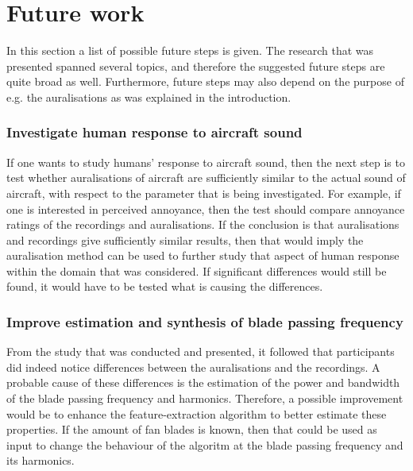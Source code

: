 \newpage
\section{Future work}
In this section a list of possible future steps is given. The research that was
presented spanned several topics, and therefore the suggested future steps are
quite broad as well. Furthermore, future steps may also depend on the purpose of
e.g. the auralisations as was explained in the introduction.

\subsubsection*{Investigate human response to aircraft sound}
If one wants to study humans' response to aircraft sound, then the next step is
to test whether auralisations of aircraft are sufficiently similar to the actual
sound of aircraft, with respect to the parameter that is being investigated. For
example, if one is interested in perceived annoyance, then the test should
compare annoyance ratings of the recordings and auralisations. If the conclusion
is that auralisations and recordings give sufficiently similar results, then
that would imply the auralisation method can be used to further study that
aspect of human response within the domain that was considered. If significant
differences would still be found, it would have to be tested what is causing the
differences.

\subsubsection*{Improve estimation and synthesis of blade passing frequency}
From the study that was conducted and presented, it followed that
participants did indeed notice differences between the auralisations and the
recordings. A probable cause of these differences is the estimation of the
power and bandwidth of the blade passing frequency and harmonics. Therefore, a
possible improvement would be to enhance the feature-extraction algorithm to
better estimate these properties. If the amount of fan blades is known, then that
could be used as input to change the behaviour of the algoritm at the blade passing
frequency and its harmonics.


